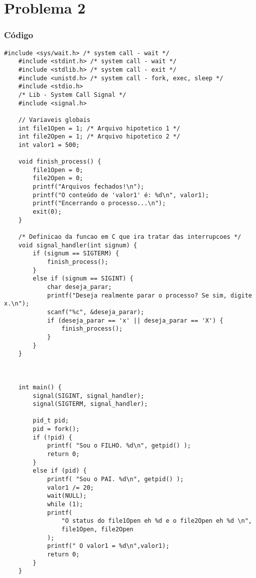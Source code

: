 \chapter{Problema 2}

\subsection*{Código}


\begin{lstlisting}[style=CStyle]
    #include <sys/wait.h> /* system call - wait */
    #include <stdint.h> /* system call - wait */
    #include <stdlib.h> /* system call - exit */
    #include <unistd.h> /* system call - fork, exec, sleep */
    #include <stdio.h>
    /* Lib - System Call Signal */
    #include <signal.h>
    
    // Variaveis globais
    int file1Open = 1; /* Arquivo hipotetico 1 */
    int file2Open = 1; /* Arquivo hipotetico 2 */
    int valor1 = 500;
    
    void finish_process() {
        file1Open = 0;
        file2Open = 0;
        printf("Arquivos fechados!\n");
        printf("O conteúdo de 'valor1' é: %d\n", valor1);
        printf("Encerrando o processo...\n");
        exit(0);
    }
    
    /* Definicao da funcao em C que ira tratar das interrupcoes */
    void signal_handler(int signum) {
        if (signum == SIGTERM) {
            finish_process();
        }
        else if (signum == SIGINT) {
            char deseja_parar;
            printf("Deseja realmente parar o processo? Se sim, digite x.\n");
            scanf("%c", &deseja_parar);
            if (deseja_parar == 'x' || deseja_parar == 'X') {
                finish_process();
            }
        } 
    }
    
    
    
    int main() {
        signal(SIGINT, signal_handler);
        signal(SIGTERM, signal_handler);
    
        pid_t pid;
        pid = fork();
        if (!pid) {
            printf( "Sou o FILHO. %d\n", getpid() );
            return 0;
        }
        else if (pid) {
            printf( "Sou o PAI. %d\n", getpid() );
            valor1 /= 20;
            wait(NULL);
            while (1);
            printf(
                "O status do file1Open eh %d e o file2Open eh %d \n", 
                file1Open, file2Open
            );
            printf(" O valor1 = %d\n",valor1);
            return 0;
        }
    }
    
\end{lstlisting}
